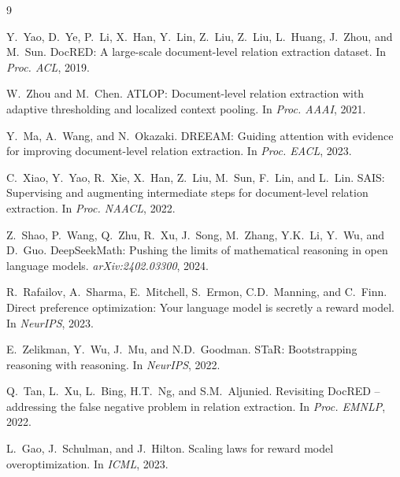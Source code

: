 \documentclass[11pt,a4paper]{article}
\begin{document}
\begin{thebibliography}{9}

Y.~Yao, D.~Ye, P.~Li, X.~Han, Y.~Lin, Z.~Liu, Z.~Liu, L.~Huang, J.~Zhou, and M.~Sun.
DocRED: A large-scale document-level relation extraction dataset.
In \emph{Proc. ACL}, 2019.

W.~Zhou and M.~Chen.
ATLOP: Document-level relation extraction with adaptive thresholding and localized context pooling.
In \emph{Proc. AAAI}, 2021.

Y.~Ma, A.~Wang, and N.~Okazaki.
DREEAM: Guiding attention with evidence for improving document-level relation extraction.
In \emph{Proc. EACL}, 2023.

C.~Xiao, Y.~Yao, R.~Xie, X.~Han, Z.~Liu, M.~Sun, F.~Lin, and L.~Lin.
SAIS: Supervising and augmenting intermediate steps for document-level relation extraction.
In \emph{Proc. NAACL}, 2022.

Z.~Shao, P.~Wang, Q.~Zhu, R.~Xu, J.~Song, M.~Zhang, Y.K.~Li, Y.~Wu, and D.~Guo.
DeepSeekMath: Pushing the limits of mathematical reasoning in open language models.
\emph{arXiv:2402.03300}, 2024.

R.~Rafailov, A.~Sharma, E.~Mitchell, S.~Ermon, C.D.~Manning, and C.~Finn.
Direct preference optimization: Your language model is secretly a reward model.
In \emph{NeurIPS}, 2023.

E.~Zelikman, Y.~Wu, J.~Mu, and N.D.~Goodman.
STaR: Bootstrapping reasoning with reasoning.
In \emph{NeurIPS}, 2022.

Q.~Tan, L.~Xu, L.~Bing, H.T.~Ng, and S.M.~Aljunied.
Revisiting DocRED -- addressing the false negative problem in relation extraction.
In \emph{Proc. EMNLP}, 2022.

L.~Gao, J.~Schulman, and J.~Hilton.
Scaling laws for reward model overoptimization.
In \emph{ICML}, 2023.

\end{thebibliography}
\end{document}
